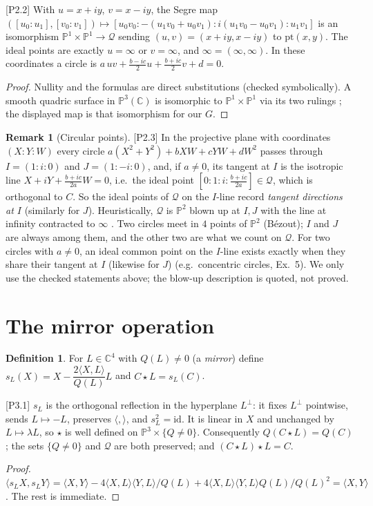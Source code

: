 \documentclass[11pt]{article}
\theoremstyle{definition}\newtheorem{definition}[theorem]{Definition}\newtheorem{remark}[theorem]{Remark}\newtheorem{example}[theorem]{Example}
\newcommand{\C}{\mathbb{C}}\newcommand{\R}{\mathbb{R}}\newcommand{\PP}{\mathbb{P}}
\newcommand{\ip}[2]{\langle #1,#2\rangle}\newcommand{\pt}{\mathrm{pt}}\newcommand{\Qd}{\mathcal{Q}}
\newcommand{\chk}[1]{\hfill{\footnotesize\textsf{[#1]}}}
\begin{document}
\begin{proposition}[The quadric is $\PP^1\times\PP^1$]\label{prop:segre}\chk{P2.2}
With $u=x+iy$, $v=x-iy$, the Segre map $([u_0:u_1],[v_0:v_1])\mapsto[u_0v_0:-(u_1v_0+u_0v_1):i(u_1v_0-u_0v_1):u_1v_1]$ is an isomorphism $\PP^1\times\PP^1\to\Qd$ sending $(u,v)=(x+iy,x-iy)$ to $\pt(x,y)$. The ideal points are exactly $u=\infty$ or $v=\infty$, and $\infty=(\infty,\infty)$. In these coordinates a circle is $a\,uv+\tfrac{b-ic}{2}u+\tfrac{b+ic}{2}v+d=0$.
\end{proposition}
\begin{proof}
Nullity and the formulas are direct substitutions (checked symbolically). A smooth quadric surface in $\PP^3(\C)$ is isomorphic to $\PP^1\times\PP^1$ via its two rulings \cite[Ex.~2.21]{Har92}; the displayed map is that isomorphism for our $G$.
\end{proof}

\begin{remark}[Circular points]\label{rem:IJ}\chk{P2.3}
In the projective plane with coordinates $(X:Y:W)$ every circle $a(X^2+Y^2)+bXW+cYW+dW^2$ passes through $I=(1:i:0)$ and $J=(1:-i:0)$, and, if $a\neq0$, its tangent at $I$ is the isotropic line $X+iY+\tfrac{b+ic}{2a}W=0$, i.e.\ the ideal point $[0:1:i:\tfrac{b+ic}{2a}]\in\Qd$, which is orthogonal to $C$. So the ideal points of $\Qd$ on the $I$-line record \emph{tangent directions at $I$} (similarly for $J$). Heuristically, $\Qd$ is $\PP^2$ blown up at $I,J$ with the line at infinity contracted to $\infty$ \cite{Har92}. Two circles meet in $4$ points of $\PP^2$ (Bézout); $I$ and $J$ are always among them, and the other two are what we count on $\Qd$. For two circles with $a\neq0$, an ideal common point on the $I$-line exists exactly when they share their tangent at $I$ (likewise for $J$) (e.g.\ concentric circles, Ex.~5). We only use the checked statements above; the blow-up description is quoted, not proved.
\end{remark}

\section{The mirror operation}\label{sec:star}
\begin{definition}
For $L\in\C^4$ with $Q(L)\neq0$ (a \emph{mirror}) define $s_L(X)=X-\dfrac{2\ip XL}{Q(L)}L$ and $C\star L=s_L(C)$.
\end{definition}

\begin{proposition}\label{prop:refl}\chk{P3.1}
$s_L$ is the orthogonal reflection in the hyperplane $L^\perp$: it fixes $L^\perp$ pointwise, sends $L\mapsto-L$, preserves $\ip{}{}$, and $s_L^2=\mathrm{id}$. It is linear in $X$ and unchanged by $L\mapsto\lambda L$, so $\star$ is well defined on $\PP^3\times\{Q\ne0\}$. Consequently $Q(C\star L)=Q(C)$; the sets $\{Q\neq0\}$ and $\Qd$ are both preserved; and $(C\star L)\star L=C$.
\end{proposition}
\begin{proof}
$\ip{s_LX}{s_LY}=\ip XY-4\ip XL\ip YL/Q(L)+4\ip XL\ip YL Q(L)/Q(L)^2=\ip XY$. The rest is immediate.
\end{proof}
\end{document}
